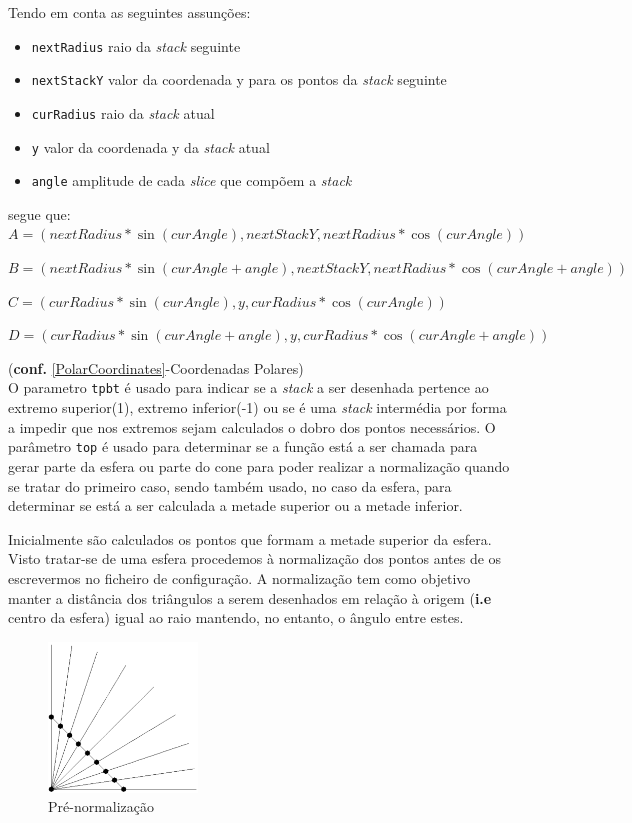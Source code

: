 \documentclass{article}
\begin{document}
Tendo em conta as seguintes assunções:
\begin{itemize}
    \item \texttt{nextRadius} raio da \textit{stack} seguinte
    \item \texttt{nextStackY} valor da coordenada y para os pontos da \textit{stack} seguinte
    \item \texttt{curRadius} raio da \textit{stack} atual
    \item \texttt{y} valor da coordenada y da \textit{stack} atual
    \item \texttt{angle} amplitude de cada \textit{slice} que compõem a \textit{stack}
\end{itemize}
segue que:
\\

$A=(nextRadius*\sin(curAngle),nextStackY,nextRadius*\cos(curAngle))$

$B=(nextRadius*\sin(curAngle+angle),nextStackY,nextRadius*\cos(curAngle+angle))$

$C=(curRadius*\sin(curAngle),y,curRadius*\cos(curAngle))$

$D=(curRadius*\sin(curAngle+angle),y,curRadius*\cos(curAngle+angle))$


(\textbf{conf.} \ref{PolarCoordinates}-Coordenadas Polares)
\\

O parametro \texttt{tpbt} é usado para indicar se a \textit{stack} a ser desenhada pertence ao extremo superior(1), extremo inferior(-1) ou se é uma \textit{stack} intermédia por forma a impedir que nos extremos sejam calculados o dobro dos pontos necessários. O parâmetro \texttt{top} é usado para determinar se a função está a ser chamada para gerar parte da esfera ou parte do cone para poder realizar a normalização quando se tratar do primeiro caso, sendo também usado, no caso da esfera, para determinar se está a ser calculada a metade superior ou a metade inferior.

Inicialmente são calculados os pontos que formam a metade superior da esfera. Visto tratar-se de uma esfera procedemos à normalização dos pontos antes de os escrevermos no ficheiro de configuração. A normalização tem como objetivo manter a distância dos triângulos a serem desenhados em relação à origem (\textbf{i.e} centro da esfera) igual ao raio mantendo, no entanto, o ângulo entre estes.

\begin{figure}[H]
    \centering
    \includegraphics[height=4cm]{beforeNorm.png}
    \caption{Pré-normalização}
\end{figure}
\end{document}
